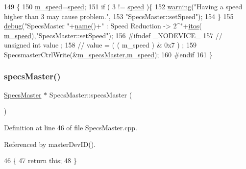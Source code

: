 \begin{DoxyCode}
149                                              \{
150   \hyperlink{classSpecsMaster_af75996281787299ccd92555512802814}{m\_speed}=\hyperlink{classSpecsMaster_ad50f852711a25ab247b6bc0603db498d}{speed};
151   \textcolor{keywordflow}{if} ( 3 != \hyperlink{classSpecsMaster_ad50f852711a25ab247b6bc0603db498d}{speed} )\{
152     \hyperlink{classObject_a65cd4fda577711660821fd2cd5a3b4c9}{warning}(\textcolor{stringliteral}{"Having a speed higher than 3 may cause problem."},
153             \textcolor{stringliteral}{"SpecsMaster::setSpeed"});
154   \}
155   \hyperlink{classObject_aac010553f022165573714b7014a15f0d}{debug}(\textcolor{stringliteral}{"SpecsMaster "}+\hyperlink{classObject_a300f4c05dd468c7bb8b3c968868443c1}{name}()+\textcolor{stringliteral}{" : Speed Reduction -> 2^"}+\hyperlink{Tools_8h_af330027dbdafb9a30768b3613c553e60}{itos}(
      \hyperlink{classSpecsMaster_af75996281787299ccd92555512802814}{m\_speed}),\textcolor{stringliteral}{"SpecsMaster::setSpeed"});
156 \textcolor{preprocessor}{#ifndef \_NODEVICE\_
}
157   \textcolor{comment}{//  unsigned int value ;}
158   \textcolor{comment}{//  value = ( ( m\_speed ) & 0x7 ) ;}
159   SpecsmasterCtrlWrite(&\hyperlink{classSpecsMaster_a32497dbb9887b6c546113135f3acc6b1}{m\_specsMaster},\hyperlink{classSpecsMaster_af75996281787299ccd92555512802814}{m\_speed});
160 \textcolor{preprocessor}{#endif
}
161 \}
\end{DoxyCode}
\mbox{\label{classSpecsMaster_a2d24cd3fc33848913b0da110b2a804cb}} 
\subsubsection{\texorpdfstring{specs\+Master()}{specsMaster()}}
{\footnotesize\ttfamily \hyperlink{classSpecsMaster}{Specs\+Master} $\ast$ Specs\+Master\+::specs\+Master (\begin{DoxyParamCaption}{ }\end{DoxyParamCaption})}



Definition at line 46 of file Specs\+Master.\+cpp.



Referenced by master\+Dev\+I\+D().


\begin{DoxyCode}
46                                         \{
47   \textcolor{keywordflow}{return} \textcolor{keyword}{this};
48 \}
\end{DoxyCode}
\mbox{\label{classSpecsMaster_a960d149cda43c1f5744cbb057cb75d1f}} 
